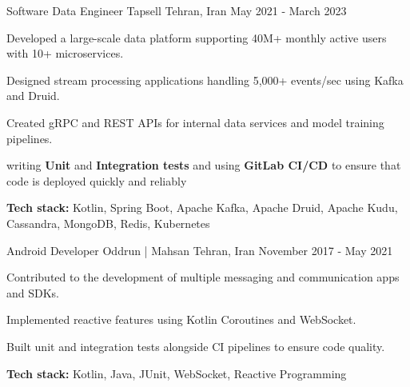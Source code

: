 \begin{cventries}
    \cventry
    {Software Data Engineer} %
    {Tapsell} %
    {Tehran, Iran} %
    {May 2021 - March 2023} %
    {
      \begin{cvitems} %
        \item Developed a large-scale data platform supporting 40M+ monthly active users with 10+ microservices.
        \item Designed stream processing applications handling 5,000+ events/sec using Kafka and Druid.
        \item Created gRPC and REST APIs for internal data services and model training pipelines.
        \item writing \textbf{Unit} and \textbf{Integration tests} and using \textbf{GitLab CI/CD} to ensure that code is deployed quickly and reliably
        \item \textbf{Tech stack:} Kotlin, Spring Boot, Apache Kafka, Apache Druid, Apache Kudu, Cassandra, MongoDB, Redis, Kubernetes
      \end{cvitems}
    }

    \cventry
    {Android Developer} %
    {Oddrun | Mahsan} %
    {Tehran, Iran} %
    {November 2017 - May 2021} %
    {
      \begin{cvitems} %
        \item Contributed to the development of multiple messaging and communication apps and SDKs.
        \item Implemented reactive features using Kotlin Coroutines and WebSocket.
        \item Built unit and integration tests alongside CI pipelines to ensure code quality.
        \item \textbf{Tech stack:} Kotlin, Java, JUnit, WebSocket, Reactive Programming
      \end{cvitems}
    }

\end{cventries}
